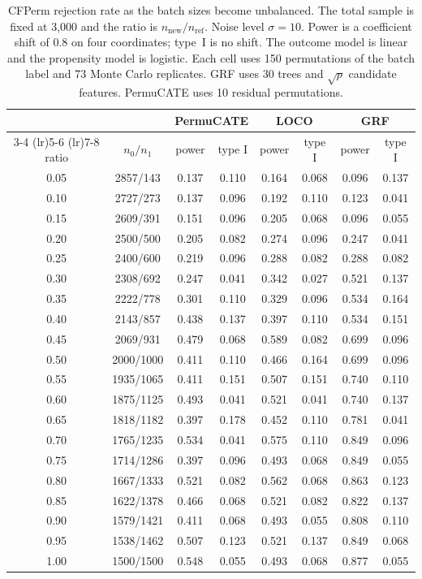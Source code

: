 \documentclass{article}
\begin{document}
\begin{table}[ht]
\centering
\small
\caption{CFPerm rejection rate as the batch sizes become unbalanced.
The total sample is fixed at 3{,}000 and the ratio is $n_{\mathrm{new}}/n_{\mathrm{ref}}$.
Noise level $\sigma=10$. Power is a coefficient shift of $0.8$ on four coordinates; type~I is no shift.
The outcome model is linear and the propensity model is logistic.
Each cell uses 150 permutations of the batch label and 73 Monte Carlo replicates.
GRF uses 30 trees and $\sqrt{p}$ candidate features. PermuCATE uses 10 residual permutations.}
\label{tab:imbalance}
\begin{tabular}{cccccccc}
\toprule
& & \multicolumn{2}{c}{PermuCATE} & \multicolumn{2}{c}{LOCO} & \multicolumn{2}{c}{GRF} \\
\cmidrule(lr){3-4} \cmidrule(lr){5-6} \cmidrule(lr){7-8}
ratio & $n_0/n_1$ & power & type I & power & type I & power & type I \\
\midrule
0.05 & 2857/143 & 0.137 & 0.110 & 0.164 & 0.068 & 0.096 & 0.137 \\
0.10 & 2727/273 & 0.137 & 0.096 & 0.192 & 0.110 & 0.123 & 0.041 \\
0.15 & 2609/391 & 0.151 & 0.096 & 0.205 & 0.068 & 0.096 & 0.055 \\
0.20 & 2500/500 & 0.205 & 0.082 & 0.274 & 0.096 & 0.247 & 0.041 \\
0.25 & 2400/600 & 0.219 & 0.096 & 0.288 & 0.082 & 0.288 & 0.082 \\
0.30 & 2308/692 & 0.247 & 0.041 & 0.342 & 0.027 & 0.521 & 0.137 \\
0.35 & 2222/778 & 0.301 & 0.110 & 0.329 & 0.096 & 0.534 & 0.164 \\
0.40 & 2143/857 & 0.438 & 0.137 & 0.397 & 0.110 & 0.534 & 0.151 \\
0.45 & 2069/931 & 0.479 & 0.068 & 0.589 & 0.082 & 0.699 & 0.096 \\
0.50 & 2000/1000 & 0.411 & 0.110 & 0.466 & 0.164 & 0.699 & 0.096 \\
0.55 & 1935/1065 & 0.411 & 0.151 & 0.507 & 0.151 & 0.740 & 0.110 \\
0.60 & 1875/1125 & 0.493 & 0.041 & 0.521 & 0.041 & 0.740 & 0.137 \\
0.65 & 1818/1182 & 0.397 & 0.178 & 0.452 & 0.110 & 0.781 & 0.041 \\
0.70 & 1765/1235 & 0.534 & 0.041 & 0.575 & 0.110 & 0.849 & 0.096 \\
0.75 & 1714/1286 & 0.397 & 0.096 & 0.493 & 0.068 & 0.849 & 0.055 \\
0.80 & 1667/1333 & 0.521 & 0.082 & 0.562 & 0.068 & 0.863 & 0.123 \\
0.85 & 1622/1378 & 0.466 & 0.068 & 0.521 & 0.082 & 0.822 & 0.137 \\
0.90 & 1579/1421 & 0.411 & 0.068 & 0.493 & 0.055 & 0.808 & 0.110 \\
0.95 & 1538/1462 & 0.507 & 0.123 & 0.521 & 0.137 & 0.849 & 0.068 \\
1.00 & 1500/1500 & 0.548 & 0.055 & 0.493 & 0.068 & 0.877 & 0.055 \\
\bottomrule
\end{tabular}
\end{table}
\end{document}
